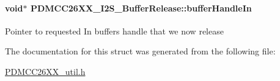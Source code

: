 \paragraph[{buffer\+Handle\+In}]{\setlength{\rightskip}{0pt plus 5cm}void$\ast$ P\+D\+M\+C\+C26\+X\+X\+\_\+\+I2\+S\+\_\+\+Buffer\+Release\+::buffer\+Handle\+In}\label{struct_p_d_m_c_c26_x_x___i2_s___buffer_release_aba73b8ce3a0b12b652c0078ad6cf2169}
Pointer to requested In buffers handle that we now release 

The documentation for this struct was generated from the following file\+:\begin{DoxyCompactItemize}
\item 
\hyperlink{_p_d_m_c_c26_x_x__util_8h}{P\+D\+M\+C\+C26\+X\+X\+\_\+util.\+h}\end{DoxyCompactItemize}
